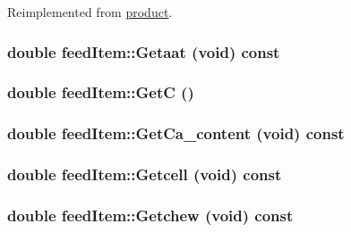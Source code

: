 Reimplemented from \hyperlink{classproduct_a57ad202aca39d005745e104f91349908}{product}.\hypertarget{classfeed_item_af006fe328a679e742fea693274e4cd18}{
\subsubsection[{Getaat}]{\setlength{\rightskip}{0pt plus 5cm}double feedItem::Getaat (void) const}}
\label{classfeed_item_af006fe328a679e742fea693274e4cd18}
\hypertarget{classfeed_item_a6b6490080cfae6efeaaeb7d4f92f9d05}{
\subsubsection[{GetC}]{\setlength{\rightskip}{0pt plus 5cm}double feedItem::GetC ()}}
\label{classfeed_item_a6b6490080cfae6efeaaeb7d4f92f9d05}
\hypertarget{classfeed_item_a4d1c2b2b2a7712efa574f7449778ea2e}{
\subsubsection[{GetCa\_\-content}]{\setlength{\rightskip}{0pt plus 5cm}double feedItem::GetCa\_\-content (void) const}}
\label{classfeed_item_a4d1c2b2b2a7712efa574f7449778ea2e}
\hypertarget{classfeed_item_a9dfd0196ca3903aa35cd16cf4347e24f}{
\subsubsection[{Getcell}]{\setlength{\rightskip}{0pt plus 5cm}double feedItem::Getcell (void) const}}
\label{classfeed_item_a9dfd0196ca3903aa35cd16cf4347e24f}
\hypertarget{classfeed_item_abba921ea9d212032fd7b26f9b88a914b}{
\subsubsection[{Getchew}]{\setlength{\rightskip}{0pt plus 5cm}double feedItem::Getchew (void) const}}
